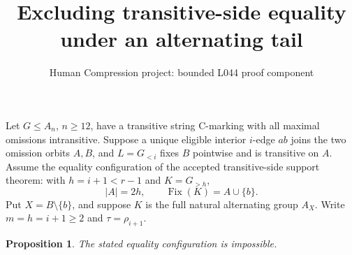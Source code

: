 \documentclass[11pt,a4paper]{article}
\title{Excluding transitive-side equality under an alternating tail}
\author{Human Compression project: bounded L044 proof component}
\date{}
\newtheorem{proposition}{Proposition}
\begin{document}
\maketitle
Let $G\leq A_n$, $n\geq12$, have a transitive string C-marking
with all maximal omissions intransitive. Suppose a unique eligible
interior $i$-edge $ab$ joins the two omission orbits $A,B$, and
$L=G_{<i}$ fixes $B$ pointwise and is transitive on $A$.
Assume the equality configuration of the accepted transitive-side
support theorem: with $h=i+1<r-1$ and $K=G_{>h}$,
\[
 |A|=2h,\qquad \operatorname{Fix}(K)=A\cup\{b\}.
\]
Put $X=B\setminus\{b\}$, and suppose $K$ is the full natural
alternating group $A_X$. Write $m=h=i+1\geq2$ and
$\tau=\rho_{i+1}$.

\begin{proposition}
The stated equality configuration is impossible.
\end{proposition}
\end{document}

